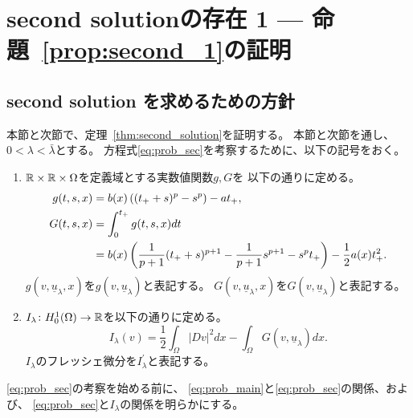 \section{second solutionの存在 1 --- 命題~\ref{prop:second_1}の証明}

\subsection{second solution を求めるための方針}

本節と次節で、定理~\ref{thm:second_solution}を証明する。
本節と次節を通し、$0 < \lambda < \bar{\lambda}$とする。
方程式\ref{eq:prob_sec}を考察するために、以下の記号をおく。

\begin{nota}
 \begin{enumerate}[1.]
  \item $\mathbb{R} \times \mathbb{R} \times \Omega$を定義域とする実数値関数$g, G$を
        以下の通りに定める。
        \begin{align}
         g(t, s, x) &= b(x) \left( (t_+ + s)^p - s^p \right) - a t_+, 
         \label{eq:def_g} \\
         G(t, s, x) &= \int_0^{t_+} g(t, s, x) dt
         \notag \\
         &= b(x) \left( \frac{1}{p+1} (t_+ + s)^{p+1} - \frac{1}{p+1}
         s^{p+1} - s^p t_+ \right) - \frac{1}{2} a(x) t_+^2.
         \label{eq:def_G}
        \end{align}
        $g(v, \underline{u}_\lambda, x)$を$g(v, \underline{u}_\lambda
        )$と表記する。
        $G(v,\underline{u}_\lambda, x)$を$G(v, \underline{u}_\lambda
        )$と表記する。
  \item $I_{\lambda} \colon H_0^1(\Omega) \to \mathbb{R}$を以下の通りに定める。
        \begin{equation}
         I_\lambda (v) = \frac{1}{2} \int_\Omega \lvert Dv \rvert^2 dx
          - \int_\Omega G(v, \underline{u}_\lambda) dx. \label{eq:def_I}
        \end{equation}
        $I_\lambda$のフレッシェ微分を$I_\lambda^\prime$と表記する。
 \end{enumerate}
\end{nota}

\ref{eq:prob_sec}の考察を始める前に、
\ref{eq:prob_main}と\ref{eq:prob_sec}の関係、および、
\ref{eq:prob_sec}と$I_\lambda$の関係を明らかにする。

